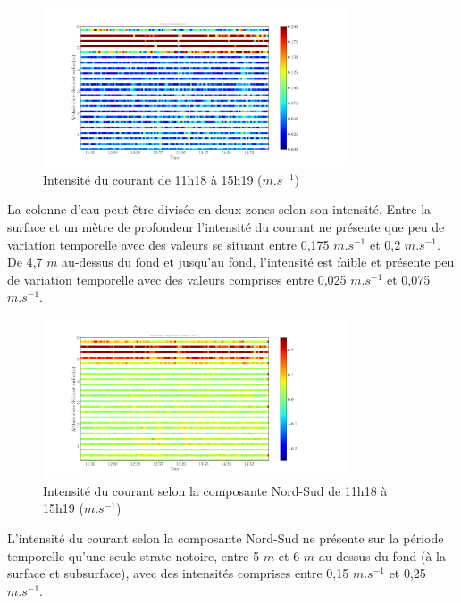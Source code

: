 \documentclass[12pt]{article}
\begin{document}
\begin{figure}[!h]
	\begin{center}
		\includegraphics[width=0.8\textwidth]{180321021scatterintensity.png}
		\caption{Intensité du courant de 11h18 à 15h19 ($m.s^{-1}$)}
	\end{center}
\end{figure}
La colonne d'eau peut être divisée en deux zones selon son intensité. Entre la surface et un mètre de profondeur l'intensité du courant ne présente que peu de variation temporelle avec des valeurs se situant entre 0,175 $m.s^{-1}$ et 0,2 $m.s^{-1}$. De 4,7 $m$ au-dessus du fond et jusqu'au fond, l'intensité est faible et présente peu de variation temporelle avec des valeurs comprises entre 0,025 $m.s^{-1}$ et 0,075 $m.s^{-1}$.\\

\begin{figure}[!h]
	\begin{center}
		\includegraphics[width=0.8\textwidth]{180321021scatterv2.png}
		\caption{Intensité du courant selon la composante Nord-Sud de 11h18 à 15h19 ($m.s^{-1}$)}
	\end{center}
\end{figure}
L'intensité du courant selon la composante Nord-Sud ne présente sur la période temporelle qu'une seule strate notoire, entre 5 $m$ et 6 $m$ au-dessus du fond (à la surface et subsurface), avec des intensités comprises entre 0,15 $m.s^{-1}$ et 0,25 $m.s^{-1}$.\\
\end{document}
